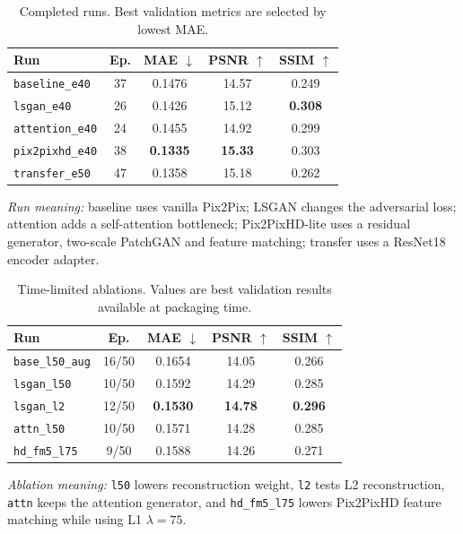 \documentclass[conference]{IEEEtran}
\newcommand{\code}[1]{\texttt{#1}}
\begin{document}
\begin{table}[H]
\caption{Completed runs. Best validation metrics are selected by lowest MAE.}
\label{tab:completed}
\centering
\scriptsize
\begin{tabular}{p{}cccc}
\toprule
Run & Ep. & MAE $\downarrow$ & PSNR $\uparrow$ & SSIM $\uparrow$ \\
\midrule
\code{baseline\_e40} & 37 & 0.1476 & 14.57 & 0.249 \\
\code{lsgan\_e40} & 26 & 0.1426 & 15.12 & \textbf{0.308} \\
\code{attention\_e40} & 24 & 0.1455 & 14.92 & 0.299 \\
\code{pix2pixhd\_e40} & 38 & \textbf{0.1335} & \textbf{15.33} & 0.303 \\
\code{transfer\_e50} & 47 & 0.1358 & 15.18 & 0.262 \\
\bottomrule
\end{tabular}
\end{table}
\noindent\footnotesize
\emph{Run meaning:} baseline uses vanilla Pix2Pix; LSGAN changes the adversarial loss; attention adds a self-attention bottleneck; Pix2PixHD-lite uses a residual generator, two-scale PatchGAN and feature matching; transfer uses a ResNet18 encoder adapter.
\normalsize
\FloatBarrier

\begin{table}[H]
\caption{Time-limited ablations. Values are best validation results available at packaging time.}
\label{tab:running}
\centering
\scriptsize
\begin{tabular}{p{}cccc}
\toprule
Run & Ep. & MAE $\downarrow$ & PSNR $\uparrow$ & SSIM $\uparrow$ \\
\midrule
\code{base\_l50\_aug} & 16/50 & 0.1654 & 14.05 & 0.266 \\
\code{lsgan\_l50} & 10/50 & 0.1592 & 14.29 & 0.285 \\
\code{lsgan\_l2} & 12/50 & \textbf{0.1530} & \textbf{14.78} & \textbf{0.296} \\
\code{attn\_l50} & 10/50 & 0.1571 & 14.28 & 0.285 \\
\code{hd\_fm5\_l75} & 9/50 & 0.1588 & 14.26 & 0.271 \\
\bottomrule
\end{tabular}
\end{table}
\noindent\footnotesize
\emph{Ablation meaning:} \code{l50} lowers reconstruction weight, \code{l2} tests L2 reconstruction, \code{attn} keeps the attention generator, and \code{hd\_fm5\_l75} lowers Pix2PixHD feature matching while using L1 $\lambda=75$.
\normalsize
\FloatBarrier
\end{document}
